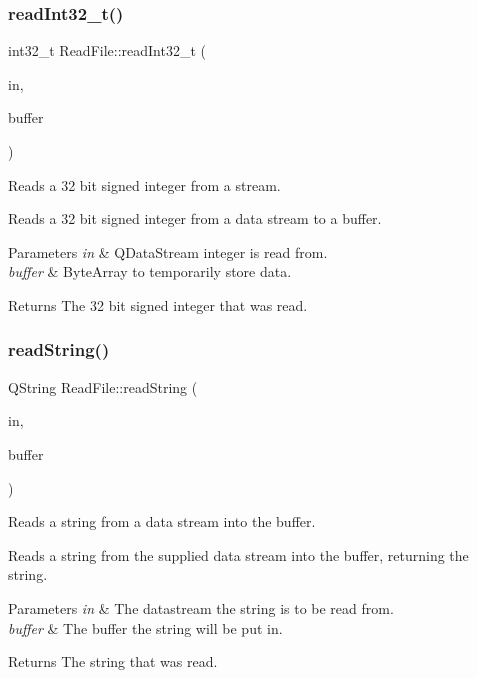 \subsubsection{\texorpdfstring{read\+Int32\+\_\+t()}{readInt32\_t()}}
{\footnotesize\ttfamily int32\+\_\+t Read\+File\+::read\+Int32\+\_\+t (\begin{DoxyParamCaption}\item[{Q\+Data\+Stream $\ast$}]{in,  }\item[{Q\+Byte\+Array $\ast$}]{buffer }\end{DoxyParamCaption})\hspace{0.3cm}{\ttfamily [static]}}



Reads a 32 bit signed integer from a stream. 

Reads a 32 bit signed integer from a data stream to a buffer. 
\begin{DoxyParams}{Parameters}
{\em in} & Q\+Data\+Stream integer is read from. \\
\hline
{\em buffer} & Byte\+Array to temporarily store data. \\
\hline
\end{DoxyParams}
\begin{DoxyReturn}{Returns}
The 32 bit signed integer that was read. 
\end{DoxyReturn}
\mbox{\label{class_read_file_a155af28990d8464aa556663462ec7e83}} 
\subsubsection{\texorpdfstring{read\+String()}{readString()}}
{\footnotesize\ttfamily Q\+String Read\+File\+::read\+String (\begin{DoxyParamCaption}\item[{Q\+Data\+Stream $\ast$}]{in,  }\item[{Q\+Byte\+Array $\ast$}]{buffer }\end{DoxyParamCaption})\hspace{0.3cm}{\ttfamily [static]}}



Reads a string from a data stream into the buffer. 

Reads a string from the supplied data stream into the buffer, returning the string. 
\begin{DoxyParams}{Parameters}
{\em in} & The datastream the string is to be read from. \\
\hline
{\em buffer} & The buffer the string will be put in. \\
\hline
\end{DoxyParams}
\begin{DoxyReturn}{Returns}
The string that was read. 
\end{DoxyReturn}
\mbox{\label{class_read_file_ae4d7e714efdb949d33a418819c32470f}} 
